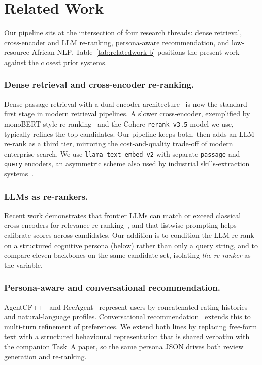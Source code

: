 \documentclass[sigconf,nonacm,balance]{acmart}
\begin{document}
\section{Related Work}

Our pipeline sits at the intersection of four research threads: dense
retrieval, cross-encoder and LLM re-ranking, persona-aware recommendation,
and low-resource African NLP. Table~\ref{tab:relatedwork-b} positions the
present work against the closest prior systems.

\subsubsection*{Dense retrieval and cross-encoder re-ranking.}
Dense passage retrieval with a dual-encoder
architecture~\cite{dpr,sbert} is now the standard first stage in modern
retrieval pipelines. A slower cross-encoder, exemplified by monoBERT-style
re-ranking~\cite{monobert} and the Cohere \texttt{rerank-v3.5} model we use,
typically refines the top candidates. Our pipeline keeps both, then adds an
LLM re-rank as a third tier, mirroring the cost-and-quality trade-off of
modern enterprise search. We use \texttt{llama-text-embed-v2} with separate
\texttt{passage} and \texttt{query} encoders, an asymmetric scheme also used
by industrial skills-extraction systems~\cite{esco-skills}.

\subsubsection*{LLMs as re-rankers.} Recent work demonstrates that frontier
LLMs can match or exceed classical cross-encoders for relevance
re-ranking~\cite{rankgpt,llmrec_survey}, and that listwise prompting helps
calibrate scores across candidates. Our addition is to condition the LLM
re-rank on a structured cognitive persona (below) rather than only a query
string, and to compare eleven backbones on the same candidate set, isolating
\emph{the re-ranker} as the variable.

\subsubsection*{Persona-aware and conversational recommendation.}
AgentCF++~\cite{agentcf} and RecAgent~\cite{recagent} represent users by
concatenated rating histories and natural-language profiles. Conversational
recommendation~\cite{convrec} extends this to multi-turn refinement of
preferences. We extend both lines by replacing free-form text with a
structured behavioural representation that is shared verbatim with the
companion Task~A paper, so the same persona JSON drives both review
generation and re-ranking.
\end{document}
